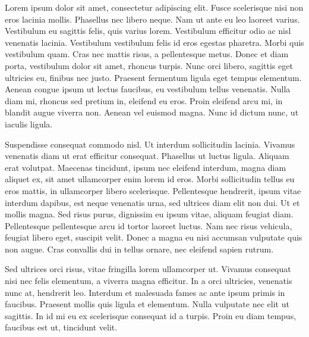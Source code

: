 \documentclass{article}
\newcommand{\voiceshrink}{-5mm}
\newenvironment{Player}
               {\begin{tcolorbox}[enhanced,
                     breakable,
                     boxsep=3pt,
  arc=1.25ex,
  colback=white,
  colframe=voice-frame,
  boxrule=3pt,
  add to width=\voiceshrink,
  leftrule=18pt,
  overlay ={%
    \node[rotate=90,
          minimum width=1cm,
          anchor=south,
          yshift=-18pt,
          black]
    at (frame.west) {PlayerTitle};
  }
  ]}{\end{tcolorbox}}
\begin{document}
\begin{Player}

Lorem ipsum dolor sit amet, consectetur adipiscing elit. Fusce scelerisque nisi non eros lacinia mollis. Phasellus nec libero neque. Nam ut ante eu leo laoreet varius. Vestibulum eu sagittis felis, quis varius lorem. Vestibulum efficitur odio ac nisl venenatis lacinia. Vestibulum vestibulum felis id eros egestas pharetra. Morbi quis vestibulum quam. Cras nec mattis risus, a pellentesque metus. Donec et diam porta, vestibulum dolor sit amet, rhoncus turpis. Nunc orci libero, sagittis eget ultricies eu, finibus nec justo. Praesent fermentum ligula eget tempus elementum. Aenean congue ipsum ut lectus faucibus, eu vestibulum tellus venenatis. Nulla diam mi, rhoncus sed pretium in, eleifend eu eros. Proin eleifend arcu mi, in blandit augue viverra non. Aenean vel euismod magna. Nunc id dictum nunc, ut iaculis ligula.

Suspendisse consequat commodo nisl. Ut interdum sollicitudin lacinia. Vivamus venenatis diam ut erat efficitur consequat. Phasellus ut luctus ligula. Aliquam erat volutpat. Maecenas tincidunt, ipsum nec eleifend interdum, magna diam aliquet ex, sit amet ullamcorper enim lorem id eros. Morbi sollicitudin tellus eu eros mattis, in ullamcorper libero scelerisque. Pellentesque hendrerit, ipsum vitae interdum dapibus, est neque venenatis urna, sed ultrices diam elit non dui. Ut et mollis magna. Sed risus purus, dignissim eu ipsum vitae, aliquam feugiat diam. Pellentesque pellentesque arcu id tortor laoreet luctus. Nam nec risus vehicula, feugiat libero eget, suscipit velit. Donec a magna eu nisi accumsan vulputate quis non augue. Cras convallis dui in tellus ornare, nec eleifend sapien rutrum.

Sed ultrices orci risus, vitae fringilla lorem ullamcorper ut. Vivamus consequat nisi nec felis elementum, a viverra magna efficitur. In a orci ultricies, venenatis nunc at, hendrerit leo. Interdum et malesuada fames ac ante ipsum primis in faucibus. Praesent mollis quis ligula et elementum. Nulla vulputate nec elit ut sagittis. In id mi eu ex scelerisque consequat id a turpis. Proin eu diam tempus, faucibus est ut, tincidunt velit.

\end{Player}
\end{document}
